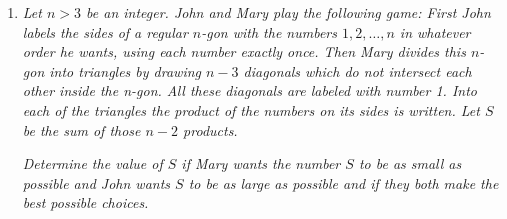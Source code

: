 \documentclass[a4paper,12pt]{article}
\begin{document}
\begin{enumerate}
	\item 
	\textit{Let $n > 3$ be an integer. John and Mary play the following game: First John labels the sides of a regular $n$-gon with the numbers $1, 2, \dotsc, n$ in whatever order he wants, using each number exactly once. Then Mary divides this $n$-gon into triangles by drawing $n − 3$ diagonals which do not intersect each other inside the n-gon. All these diagonals are labeled with number 1. Into each of the triangles the product of the numbers on its sides is written. Let $S$ be the sum of those $n − 2$ products.}
	
	\textit{Determine the value of $S$ if Mary wants the number $S$ to be as small as possible and John wants $S$ to be as large as possible and if they both make the best possible choices.}
	
	

\end{enumerate}
\end{document}
